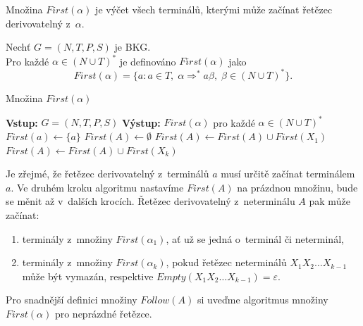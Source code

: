 Množina $First(\alpha)$ je výčet všech terminálů, kterými může začínat řetězec derivovatelný z~$\alpha$.
\begin{definition}\label{def_mnozina_first}
    Nechť $G = (N, T, P, S)$ je BKG.\\
    Pro každé $\alpha \in (N \cup T)^*$ je definováno $First(\alpha)$ jako
    \begin{equation*}
        First(\alpha) = \{a: a \in T,\; \alpha \Rightarrow^* a\beta,\; \beta \in (N \cup T)^*\}.
    \end{equation*} 
\end{definition}
\begin{algorithm}[h]
    \caption{Množina $First(\alpha)$}
    \label{alg_mnozina_first}

    \begin{algorithmic}[1]
        \State \textbf{Vstup:} $G = (N, T, P, S)$
        \State \textbf{Výstup:} $First(\alpha)$ pro každé $\alpha \in (N \cup T)^*$
        \State 
            \State $First(a) \gets \{a\}$
        \EndFor
            \State $First(A) \gets \emptyset$
        \EndFor
                \State $First(A) \gets First(A) \cup First(X_1)$
                    \State $First(A) \gets First(A) \cup First(X_k)$ 
                \EndIf
            \EndIf
        \EndWhile
    \end{algorithmic}
\end{algorithm}
Je zřejmé, že řetězec derivovatelný z~terminálů $a$ musí určitě začínat terminálem $a$.
Ve druhém kroku algoritmu nastavíme $First(A)$ na prázdnou množinu, bude se měnit až v~dalších krocích.
Řetězec derivovatelný z~neterminálu $A$ pak může začínat:
\begin{enumerate}
    \item terminály z~množiny $First(\alpha_1)$, ať už se jedná o~terminál či neterminál,
    \item terminály z~množiny $First(\alpha_k)$, pokud řetězec neterminálů $X_1X_2\ldots X_{k-1}$ může být vymazán, respektive $Empty(X_1X_2\ldots X_{k-1}) = \varepsilon$.  
\end{enumerate}
Pro snadnější definici množiny $Follow(A)$ si uveďme algoritmus množiny $First(\alpha)$ pro neprázdné řetězce.
